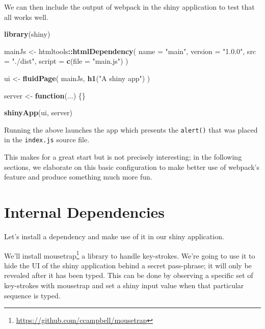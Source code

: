 \documentclass[
]{krantz}
\makeatletter
\newenvironment{Shaded}{\begin{snugshade}}{\end{snugshade}}
\newcommand{\ControlFlowTok}[1]{\textcolor[rgb]{0.27,0.27,0.27}{\textbf{#1}}}
\newcommand{\DataTypeTok}[1]{\textcolor[rgb]{0.27,0.27,0.27}{#1}}
\newcommand{\KeywordTok}[1]{\textcolor[rgb]{0.27,0.27,0.27}{\textbf{#1}}}
\newcommand{\NormalTok}[1]{#1}
\newcommand{\OperatorTok}[1]{\textcolor[rgb]{0.43,0.43,0.43}{\textbf{#1}}}
\newcommand{\StringTok}[1]{\textcolor[rgb]{0.5,0.5,0.5}{#1}}
\renewcommand{\href}[2]{#2\footnote{\url{#1}}}
\newenvironment{kframe}{%
\medskip{}
\setlength{\fboxsep}{.8em}
 \def\at@end@of@kframe{}%
 \ifinner\ifhmode%
  \def\at@end@of@kframe{\end{minipage}}%
  \begin{minipage}{\columnwidth}%
 \fi\fi%
 \def\FrameCommand##1{\hskip\@totalleftmargin \hskip-\fboxsep
 \colorbox{shadecolor}{##1}\hskip-\fboxsep
     \hskip-\linewidth \hskip-\@totalleftmargin \hskip\columnwidth}%
 \MakeFramed {\advance\hsize-\width
   \@totalleftmargin\z@ \linewidth\hsize
   \@setminipage}}%
 {\par\unskip\endMakeFramed%
 \at@end@of@kframe}
\renewenvironment{Shaded}{\begin{kframe}}{\end{kframe}}
\makeatother
\begin{document}
We can then include the output of webpack in the shiny application to test that all works well.

\begin{Shaded}
\begin{Highlighting}[]
\KeywordTok{library}\NormalTok{(shiny)}

\NormalTok{mainJs <{-}}\StringTok{ }\NormalTok{htmltools}\OperatorTok{::}\KeywordTok{htmlDependency}\NormalTok{(}
  \DataTypeTok{name =} \StringTok{"main"}\NormalTok{,}
  \DataTypeTok{version =} \StringTok{"1.0.0"}\NormalTok{,}
  \DataTypeTok{src =} \StringTok{"./dist"}\NormalTok{,}
  \DataTypeTok{script =} \KeywordTok{c}\NormalTok{(}\DataTypeTok{file =} \StringTok{"main.js"}\NormalTok{)}
\NormalTok{)}

\NormalTok{ui <{-}}\StringTok{ }\KeywordTok{fluidPage}\NormalTok{(}
\NormalTok{  mainJs,}
  \KeywordTok{h1}\NormalTok{(}\StringTok{"A shiny app"}\NormalTok{)}
\NormalTok{)}

\NormalTok{server <{-}}\StringTok{ }\ControlFlowTok{function}\NormalTok{(...) \{\}}

\KeywordTok{shinyApp}\NormalTok{(ui, server)}
\end{Highlighting}
\end{Shaded}

Running the above launches the app which presents the \texttt{alert()} that was placed in the \texttt{index.js} source file.

This makes for a great start but is not precisely interesting; in the following sections, we elaborate on this basic configuration to make better use of webpack's feature and produce something much more fun.

\hypertarget{webpack-intro-internal-dependencies}{%
\section{Internal Dependencies}\label{webpack-intro-internal-dependencies}}

Let's install a dependency and make use of it in our shiny application.

We'll install \href{https://github.com/ccampbell/mousetrap}{mousetrap} a library to handle key-strokes. We're going to use it to hide the UI of the shiny application behind a secret pass-phrase; it will only be revealed after it has been typed. This can be done by observing a specific set of key-strokes with mousetrap and set a shiny input value when that particular sequence is typed.
\end{document}
